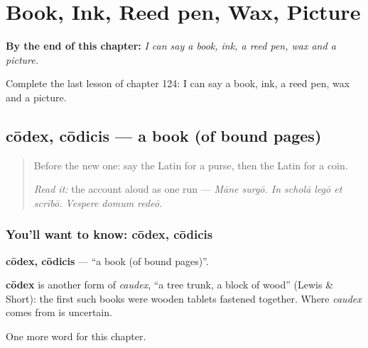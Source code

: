 
\chapter{Book, Ink, Reed pen, Wax, Picture}
\label{ch:la-book-ink-reed-pen-wax-picture}

\begin{chapteropening}
\textbf{By the end of this chapter:} \emph{I can say a book, ink, a reed pen, wax and a picture.}

Complete the last lesson of chapter 124: I can say a book, ink, a reed pen, wax and a picture.
\end{chapteropening}

\section[cōdex, cōdicis]{cōdex, cōdicis — a book (of bound pages)}

\label{lesson:LA-C124-codex}



\begin{quote}
Before the new one: say the Latin for a purse, then the Latin for a coin.

\emph{Read it:} the account aloud as one run — \emph{Māne surgō. In scholā legō et scrībō. Vespere domum redeō.}
\end{quote}

\subsection*{You'll want to know: cōdex, cōdicis}
\textbf{cōdex, cōdicis} — \textquotedblleft{}a book (of bound pages)\textquotedblright{}.

\begin{cousinweb}
\textbf{cōdex} is another form of \emph{caudex}, \textquotedblleft{}a tree trunk, a block of wood\textquotedblright{} (Lewis \& Short): the first such books were wooden tablets fastened together. Where \emph{caudex} comes from is uncertain.
\end{cousinweb}

\begin{grammarlens}[title={What you've built}]
One more word for this chapter.
\end{grammarlens}

